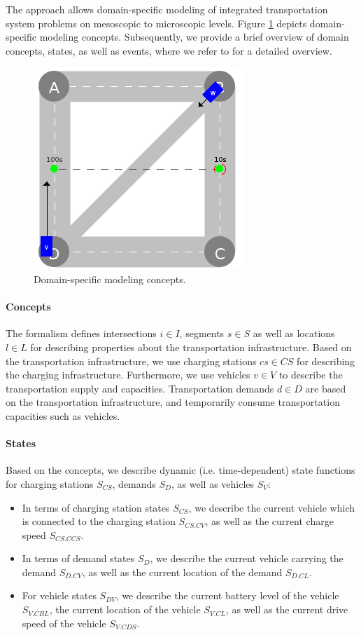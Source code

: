 \documentclass[a4paper,twoside]{article}
\begin{document}
	The approach allows domain-specific modeling of integrated transportation system problems on mesoscopic to microscopic levels.
	Figure \ref{fig:domain-specific-modeling} depicts domain-specific modeling concepts. Subsequently, we provide a brief overview of domain concepts, states, as well as events, where we refer to \cite{ascher2023discrete} for a detailed overview. 
	\begin{figure}[!ht]
		\centering
		\includegraphics[width=0.40\columnwidth]{../../events/demand.png}
		\caption{Domain-specific modeling concepts.}
		\label{fig:domain-specific-modeling}
	\end{figure}
	
	\paragraph{Concepts}
	
	The formalism defines intersections $i \in I$, segments $s \in S$ as well as locations $l \in L$ for describing properties about the transportation infrastructure.
	Based on the transportation infrastructure, we use charging stations $cs \in CS$ for describing the charging infrastructure. Furthermore, we use vehicles $v \in V$ to describe the transportation supply and capacities. Transportation demands $d \in D$ are based on the transportation infrastructure, and temporarily consume transportation capacities such as vehicles.
	
	\paragraph{States}
	Based on the concepts, we describe dynamic (i.e. time-dependent) state functions for charging stations $S_{CS}$, demands $S_{D}$, as well as vehicles $S_V$:
	
	\begin{itemize}
		\item In terms of charging station states $S_{CS}$, we describe the current vehicle which is connected to the charging station $S_{CS.CV}$, as well as the current charge speed $S_{CS.CCS}$.
		\item In terms of demand states $S_{D}$, we describe the current vehicle carrying the demand $S_{D.CV}$, as well as the current location of the demand $S_{D.CL}$.
		\item For vehicle states $S_{DV}$, we describe the current battery level of the vehicle $S_{V.CBL}$, the current location of the vehicle $S_{V.CL}$, as well as the current drive speed of the vehicle $S_{V.CDS}$.
	\end{itemize}
	
\end{document}
